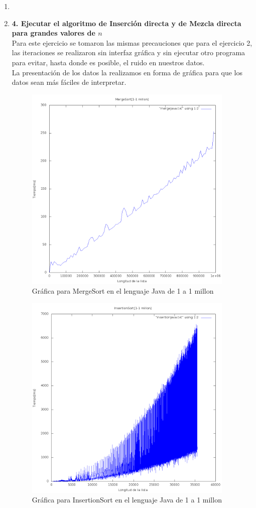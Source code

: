 \documentclass[11 pt, a4paper]{article}
\theoremstyle{definition}
\begin{document}
\begin{enumerate}
\begin{itemize}
    \end{itemize}
\item 
\item \textbf{4. Ejecutar el algoritmo de Inserción directa y de Mezcla directa para grandes valores de $n$}\\
  Para este ejercicio se tomaron las mismas precauciones que para el ejercicio 2, las iteraciones se realizaron sin
  interfaz gráfica y sin ejecutar otro programa para evitar, hasta donde es posible, el ruido en nuestros datos.\\
  La presentación de los datos la realizamos en forma de gráfica para que los datos sean más fáciles de interpretar. 
   \begin{figure}[H]
         \centering
          \includegraphics[trim=0cm 0cm 0cm 0cm, width=10cm]{1-1mJava.png} 
          \caption{Gráfica para MergeSort en el lenguaje Java de 1 a 1 millon}
      \end{figure}
      
      
       \begin{figure}[H]
         \centering
          \includegraphics[trim=0cm 0cm 0cm 0cm, width=10cm]{1-1mIJava.png} 
          \caption{Gráfica para InsertionSort en el lenguaje Java de 1 a 1 millon}
      \end{figure}
      

\end{enumerate}
\end{document}
